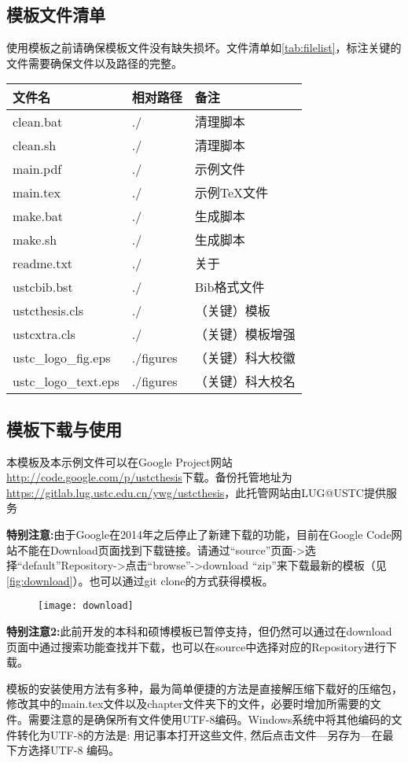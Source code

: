 \subsection{模板文件清单}
使用模板之前请确保模板文件没有缺失损坏。文件清单如\autoref{tab:filelist}，标注关键的文件需要确保文件以及路径的完整。
\begin{table}[htp]
\centering
{}
\label{tab:filelist}
\begin{tabular}{lll}
\toprule
文件名&相对路径&备注\tabularnewline
\midrule
clean.bat			&./			&清理脚本\tabularnewline
clean.sh			&./			&清理脚本\tabularnewline
main.pdf			&./			&示例文件\tabularnewline
main.tex 			&./			&示例TeX文件\tabularnewline
make.bat			&./			&生成脚本\tabularnewline
make.sh				&./			&生成脚本\tabularnewline
readme.txt			&./			&关于\tabularnewline
ustcbib.bst		&./			&Bib格式文件\tabularnewline
ustcthesis.cls		&./			&（关键）模板\tabularnewline
ustcxtra.cls		&./			&（关键）模板增强\tabularnewline
ustc\_logo\_fig.eps	&./figures	&（关键）科大校徽\tabularnewline
ustc\_logo\_text.eps&./figures	&（关键）科大校名\tabularnewline
\bottomrule
\end{tabular}
\end{table}

\subsection{模板下载与使用}
本模板及本示例文件可以在Google Project网站\url{http://code.google.com/p/ustcthesis}下载。备份托管地址为\url{https://gitlab.lug.ustc.edu.cn/ywg/ustcthesis}，此托管网站由LUG@USTC提供服务

\textbf{特别注意:}由于Google在2014年之后停止了新建下载的功能，目前在Google Code网站不能在Download页面找到下载链接。请通过“source”页面->选择“default”Repository->点击“browse”->download “zip”来下载最新的模板（见\autoref{fig:download}）。也可以通过git clone的方式获得模板。

\begin{figure}
\centering
\texttt{[image: download]}
\label{fig:download}
\end{figure}

\textbf{特别注意2:}此前开发的本科和硕博模板已暂停支持，但仍然可以通过在download页面中通过搜索功能查找并下载，也可以在source中选择对应的Repository进行下载。

模板的安装使用方法有多种，最为简单便捷的方法是直接解压缩下载好的压缩包，修改其中的main.tex文件以及chapter文件夹下的文件，必要时增加所需要的文件。需要注意的是确保所有文件使用UTF-8编码。Windows系统中将其他编码的文件转化为UTF-8的方法是: 用记事本打开这些文件, 然后点击文件—另存为—在最下方选择UTF-8 编码。

